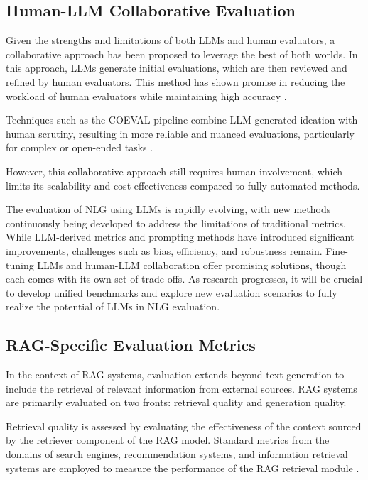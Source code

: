 \subsection{Human-LLM Collaborative Evaluation}

Given the strengths and limitations of both LLMs and human evaluators, a collaborative approach has been proposed to leverage the best of both worlds. In this approach, LLMs generate initial evaluations, which are then reviewed and refined by human evaluators. This method has shown promise in reducing the workload of human evaluators while maintaining high accuracy \cite{li2023collaborative}.

Techniques such as the COEVAL pipeline combine LLM-generated ideation with human scrutiny, resulting in more reliable and nuanced evaluations, particularly for complex or open-ended tasks \cite{zhang2021human}.

However, this collaborative approach still requires human involvement, which limits its scalability and cost-effectiveness compared to fully automated methods.

The evaluation of NLG using LLMs is rapidly evolving, with new methods continuously being developed to address the limitations of traditional metrics. While LLM-derived metrics and prompting methods have introduced significant improvements, challenges such as bias, efficiency, and robustness remain. Fine-tuning LLMs and human-LLM collaboration offer promising solutions, though each comes with its own set of trade-offs. As research progresses, it will be crucial to develop unified benchmarks and explore new evaluation scenarios to fully realize the potential of LLMs in NLG evaluation.

\subsection{RAG-Specific Evaluation Metrics}

In the context of RAG systems, evaluation extends beyond text generation to include the retrieval of relevant information from external sources. RAG systems are primarily evaluated on two fronts: retrieval quality and generation quality.

Retrieval quality is assessed by evaluating the effectiveness of the context sourced by the retriever component of the RAG model. Standard metrics from the domains of search engines, recommendation systems, and information retrieval systems are employed to measure the performance of the RAG retrieval module \cite{gao2023retrieval}.

